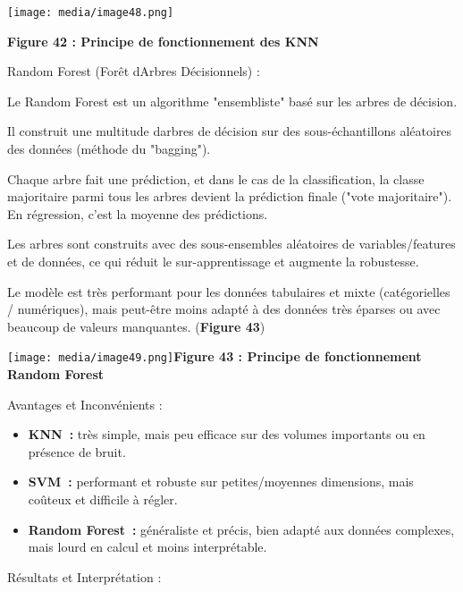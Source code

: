 \texttt{[image: media/image48.png]}

\textbf{ Figure 42 : Principe de fonctionnement des KNN}

Random Forest (Forêt d\textquotesingle Arbres Décisionnels) :

Le Random Forest est un algorithme "ensembliste" basé sur les arbres de
décision.

Il construit une multitude d\textquotesingle arbres de décision sur des
sous-échantillons aléatoires des données (méthode du "bagging").

Chaque arbre fait une prédiction, et dans le cas de la classification,
la classe majoritaire parmi tous les arbres devient la prédiction finale
("vote majoritaire"). En régression, c'est la moyenne des prédictions.

Les arbres sont construits avec des sous-ensembles aléatoires de
variables/features et de données, ce qui réduit le sur-apprentissage et
augmente la robustesse.

Le modèle est très performant pour les données tabulaires et mixte
(catégorielles / numériques), mais peut-être moins adapté à des données
très éparses ou avec beaucoup de valeurs manquantes. (\textbf{Figure
43})

\texttt{[image: media/image49.png]}\textbf{Figure
43 : Principe de fonctionnement Random Forest}

Avantages et Inconvénients :

\begin{itemize}
\tightlist
\item
  \textbf{KNN~:} très simple, mais peu efficace sur des volumes
  importants ou en présence de bruit.
\item
  \textbf{SVM~:} performant et robuste sur petites/moyennes dimensions,
  mais coûteux et difficile à régler.
\item
  \textbf{Random Forest~:} généraliste et précis, bien adapté aux
  données complexes, mais lourd en calcul et moins interprétable.
\end{itemize}

Résultats et Interprétation :
